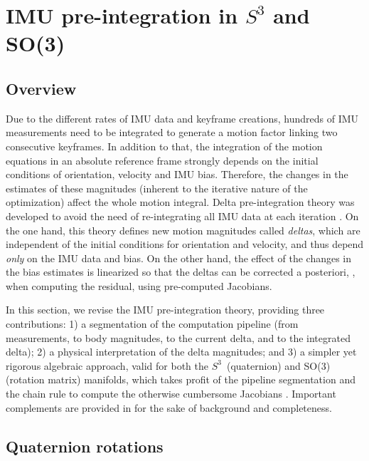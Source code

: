 




\section{IMU pre-integration in $S^3$ and SO(3)}
\label{sec:imu}

\subsection{Overview}

Due to the different rates of IMU data and keyframe creations, hundreds of IMU measurements need to be integrated to generate a motion factor linking two consecutive keyframes. 
In addition to that, the integration of the motion equations in an absolute reference frame strongly depends on the initial conditions of orientation, velocity and IMU bias.
Therefore, the changes in the estimates of these magnitudes (inherent to the iterative nature of the optimization) affect the whole motion integral. 
Delta pre-integration theory was developed to avoid the need of re-integrating all IMU data at each iteration \cite{LUPTON-09,forster2015imu}. 
On the one hand, this theory defines new motion magnitudes called \emph{deltas}, which are independent of the initial conditions for orientation and velocity, and thus depend \emph{only} on the IMU data and bias. 
On the other hand, the effect of the changes in the bias estimates is linearized so that the deltas can be corrected a posteriori, 
\ie, when computing the residual, 
using pre-computed Jacobians. 

In this section, we revise the IMU pre-integration theory, providing three contributions: 
1) a segmentation of the computation pipeline (from measurements, to body magnitudes, to the current delta, and to the integrated delta); 
2) a physical interpretation of the delta magnitudes; 
and 
3) a simpler yet rigorous algebraic approach, valid for both the $S^3$~(quaternion) and SO(3) (rotation matrix) manifolds, which takes profit of the pipeline segmentation and the chain rule to compute the otherwise cumbersome Jacobians \cite{forster2015imu}. 
Important complements are provided in  for the sake of background and completeness.

\subsection{Quaternion rotations}


